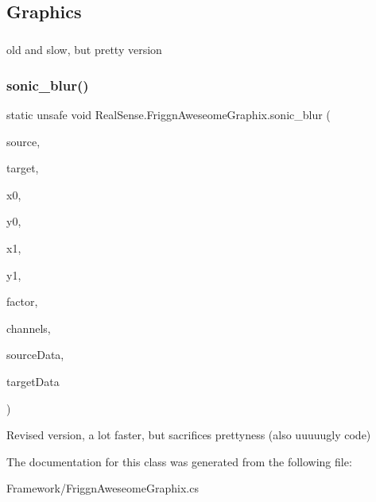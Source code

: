 \subparagraph*{}

\subsection*{Graphics}

\subparagraph*{}

old and slow, but pretty version \mbox{\label{class_real_sense_1_1_friggn_aweseome_graphix_a4ab59468a7284e0647b9814f6a0b2a57}} 
\subsubsection{sonic\+\_\+blur()}
{\footnotesize\ttfamily static unsafe void Real\+Sense.\+Friggn\+Aweseome\+Graphix.\+sonic\+\_\+blur (\begin{DoxyParamCaption}\item[{Bitmap}]{source,  }\item[{Bitmap}]{target,  }\item[{int}]{x0,  }\item[{int}]{y0,  }\item[{int}]{x1,  }\item[{int}]{y1,  }\item[{int}]{factor,  }\item[{int}]{channels,  }\item[{Bitmap\+Data}]{source\+Data,  }\item[{Bitmap\+Data}]{target\+Data }\end{DoxyParamCaption})\hspace{0.3cm}{\ttfamily [static]}}

Revised version, a lot faster, but sacrifices prettyness (also uuuuugly code) 

The documentation for this class was generated from the following file\+:\begin{DoxyCompactItemize}
\item 
Framework/Friggn\+Aweseome\+Graphix.\+cs\end{DoxyCompactItemize}
